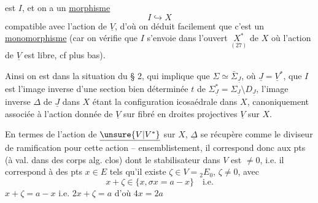 est $I$, et on a un \uline{morphisme}
\[
\tag{26}I\hookrightarrow X
\]
compatible avec l'action de $\underline V$, d'où on déduit facilement que c'est un \uline{monomorphisme} (car on vérifie que $I$ s'envoie dans l'ouvert $\underset{(27)}{X^*}$ de $X$ où l'action de $\underline V$ est libre, cf plus bas).

Ainsi on est dans la situation du § 2, qui implique que $\Sigma\simeq\bar\Sigma_{\underline J}$, où $\underline J=\underline V^*$, que $I$ est l'image inverse d'une section bien déterminée $t$ de $\Sigma_{\underline J}^*=\Sigma_{\underline J}\setminus D_{\underline J}$, l'image inverse $\Delta$ de $\underline J$ dans $X$ étant  la configuration icosaédrale dans $X$, canoniquement associée à l'action donnée de $\underline V$ sur  fibré en droites projectives $\underline V$ sur $X$.

En termes de l'action de $\underline{\unsure{V|V^*}}$ sur $X$, $\underline\Delta$ se récupère comme le diviseur de ramification pour cette action -- ensemblistement, il correspond donc aux pts (à val. dans des corps alg. clos) dont le stabilisateur dans $V$ est $\ne0$, i.e. il correspond à des pts $x\in E$ tels qu'il existe $\zeta\in V={}_2E_0$, $\zeta\ne0$, avec
\[
 x+\zeta\in\{x,\sigma x=a-x\}\quad\text{i.e.}
\]
$x+\zeta=a-x$ i.e. $2x+\zeta=a$ d'où $4x=2a$  
